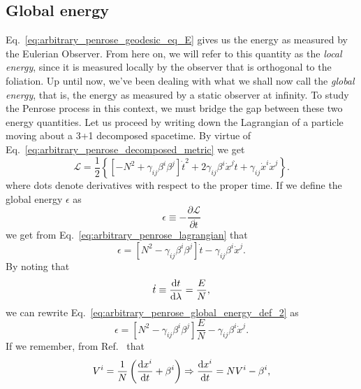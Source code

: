 \subsection{Global energy}

Eq.~\eqref{eq:arbitrary_penrose_geodesic_eq_E} gives us the energy as measured by the Eulerian Observer. From here on, we will refer to this quantity as the \emph{local energy}, since it is measured locally by the observer that is orthogonal to the foliation. Up until now, we've been dealing with what we shall now call the \emph{global energy}, that is, the energy as measured by a static observer at infinity. To study the Penrose process in this context, we must bridge the gap between these two energy quantities. Let us proceed by writing down the Lagrangian of a particle moving about a 3+1 decomposed spacetime. By virtue of Eq.~\eqref{eq:arbitrary_penrose_decomposed_metric} we get
%
\begin{equation}
  \mathcal{L} = \frac{1}{2} \left\{ \left[ -N^2 + \gamma_{ij}\beta^i\beta^j \right]\dot{t}^2 + 2 \gamma_{ij}\beta^i\dot{x}^j \dot{t} + \gamma_{ij}\dot{x}^i\dot{x}^j\right\}.
  \label{eq:arbitrary_penrose_lagrangian}
\end{equation}
%
where dots denote derivatives with respect to the proper time. If we define the global energy $\epsilon$ as
%
\begin{equation}
  \epsilon \equiv -\frac{\partial \mathcal{L}}{\partial \dot{t}}
  \label{eq:arbitrary_penrose_global_energy_def}
\end{equation}
%
we get from Eq.~\eqref{eq:arbitrary_penrose_lagrangian} that
%
\begin{equation}
  \epsilon = \left[ N^2 - \gamma_{ij}\beta^i\beta^j \right]\dot{t} - \gamma_{ij}\beta^i\dot{x}^j.
  \label{eq:arbitrary_penrose_global_energy_def_2}
\end{equation}
%
By noting that~\cite{Vincent_2012}
%
\begin{equation}
  \dot{t} \equiv \frac{\mathrm{d} t}{\mathrm{d} \lambda} = \frac{E}{N},
  \label{eq:arbitrary_penrose_t_dot_relation}
\end{equation}
%
we can rewrite Eq.~\eqref{eq:arbitrary_penrose_global_energy_def_2} as
%
\begin{equation}
  \epsilon = \left[ N^2 - \gamma_{ij}\beta^i\beta^j \right]\frac{E}{N} - \gamma_{ij}\beta^i\dot{x}^j.
  \label{eq:arbitrary_penrose_global_energy_def_3}
\end{equation}
%
If we remember, from Ref.~\cite{Vincent_2012} that
%
\begin{equation}
  V^i = \frac{1}{N}\left( \frac{\mathrm{d} x^i}{\mathrm{d} t} + \beta^i \right) \Rightarrow \frac{\mathrm{d} x^i}{\mathrm{d} t} = N V^i - \beta^i,
  \label{eq:arbitrary_penrose_vi_def}
\end{equation}
